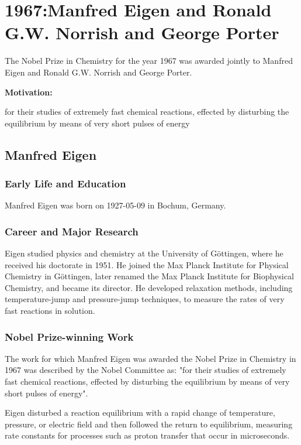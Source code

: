 \chapter{1967:Manfred Eigen and Ronald G.W. Norrish and George Porter}

\label{chap:chemistry1967}

The Nobel Prize in Chemistry for the year 1967 was awarded jointly to Manfred Eigen and Ronald G.W. Norrish and George Porter.

\textbf{Motivation:}

for their studies of extremely fast chemical reactions, effected by disturbing the equilibrium by means of very short pulses of energy

\section{Manfred Eigen}

\subsection*{Early Life and Education}

Manfred Eigen was born on 1927-05-09 in Bochum, Germany.

\subsection*{Career and Major Research}

Eigen studied physics and chemistry at the University of Göttingen, where he received his doctorate in 1951. He joined the Max Planck Institute for Physical Chemistry in Göttingen, later renamed the Max Planck Institute for Biophysical Chemistry, and became its director. He developed relaxation methods, including temperature-jump and pressure-jump techniques, to measure the rates of very fast reactions in solution.

\subsection*{Nobel Prize-winning Work}

The work for which Manfred Eigen was awarded the Nobel Prize in Chemistry in 1967 was described by the Nobel Committee as: "for their studies of extremely fast chemical reactions, effected by disturbing the equilibrium by means of very short pulses of energy".

Eigen disturbed a reaction equilibrium with a rapid change of temperature, pressure, or electric field and then followed the return to equilibrium, measuring rate constants for processes such as proton transfer that occur in microseconds.

